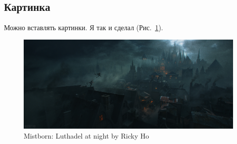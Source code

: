 \documentclass[12pt,a4paper]{article}
\begin{document}
\newpage

\subsection{Картинка}

Можно вставлять картинки. Я так и сделал (Рис.~\ref{pic:luthadel}).
\begin{figure}[!h]
	\centering
	\includegraphics[width=1.0\textwidth]{pic/ricky-ho-mistborn-luthadel-city-rickyho}
	\caption{Mistborn: Luthadel at night by Ricky Ho}
	\label{pic:luthadel}
\end{figure}
\end{document}
